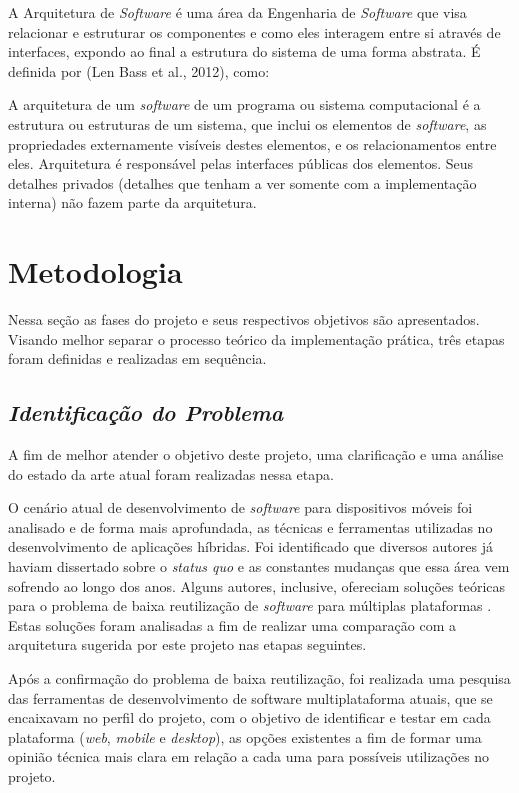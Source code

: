 A Arquitetura de \textit{Software} é uma área da Engenharia de \textit{Software} que visa relacionar e estruturar os componentes e como eles interagem entre si através de interfaces, expondo ao final a estrutura do sistema de uma forma abstrata. É definida por (Len Bass et al., 2012), como:

A arquitetura de um \textit{software} de um programa ou sistema computacional é a estrutura ou estruturas de um sistema, que inclui os elementos de \textit{software}, as propriedades externamente visíveis destes elementos, e os relacionamentos entre eles. Arquitetura é responsável pelas interfaces públicas dos elementos. Seus detalhes privados (detalhes que tenham a ver somente com a implementação interna) não fazem parte da arquitetura.

\section{\esp Metodologia}
Nessa seção as fases do projeto e seus respectivos objetivos são apresentados. Visando melhor separar o processo teórico da implementação prática, três etapas foram definidas e realizadas em sequência.

\subsection{{\it Identificação do Problema}}
A fim de melhor atender o objetivo deste projeto, uma clarificação e uma análise do estado da arte atual foram realizadas nessa etapa.

O cenário atual de desenvolvimento de \textit{software} para dispositivos móveis foi analisado e de forma mais aprofundada, as técnicas e ferramentas utilizadas no desenvolvimento de aplicações híbridas. Foi identificado que diversos autores já haviam dissertado sobre o \textit{status quo} e as constantes mudanças que essa área vem sofrendo ao longo dos anos. Alguns autores, inclusive, ofereciam soluções teóricas para o problema de baixa reutilização de \textit{software} para múltiplas plataformas \cite{Diwakar2012,ionicFIT}. Estas soluções foram analisadas a fim de realizar uma comparação com a arquitetura sugerida por este projeto nas etapas seguintes.

Após a confirmação do problema de baixa reutilização, foi realizada uma pesquisa das ferramentas de desenvolvimento de software multiplataforma atuais, que se encaixavam no perfil do projeto, com o objetivo de identificar e testar em cada plataforma (\textit{web}, \textit{mobile} e \textit{desktop}), as opções existentes a fim de formar uma opinião técnica mais clara em relação a cada uma para possíveis utilizações no projeto.

